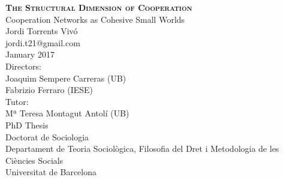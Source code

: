 \begin{titlingpage}
\begin{center}
{\HUGE \textsc{\textbf{The Structural Dimension of Cooperation}}}\\[1cm]
{\LARGE Cooperation Networks as Cohesive Small Worlds}\\[2cm]
{\Large Jordi Torrents Vivó} \\
{\large jordi.t21@gmail.com}\\[1cm]
{\Large January 2017}\\[4cm]
{\large Directors:} \\[0.2cm]
{\Large Joaquim Sempere Carreras (UB)} \\[0.2cm]
{\Large Fabrizio Ferraro (IESE)} \\[0.5cm]
{\large Tutor:} \\[0.2cm]
{\Large Mª Teresa Montagut Antolí (UB)} \\[1.5cm]
{\LARGE PhD Thesis}\\[0.5cm]
{\LARGE Doctorat de Sociologia}\\[1cm]
{\Large Departament de Teoria Sociològica, Filosofia del Dret i Metodologia de les Ciències Socials} \\[0.5cm]
{\LARGE Universitat de Barcelona}\\
\end{center}
\end{titlingpage}
\cleardoublepage
